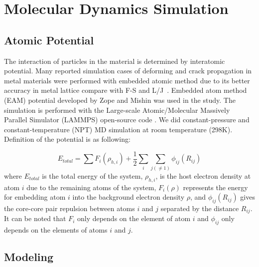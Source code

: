 \documentclass[materials,article,accept,moreauthors,pdftex,10pt,a4paper]{Definitions/mdpi}
\begin{document}
\section{Molecular Dynamics Simulation \label{section:method}}
\unskip
\subsection{Atomic Potential}

The interaction of particles in the material is determined by interatomic potential. Many reported simulation cases of deforming and crack propagation in metal materials were performed with embedded atomic method due to its better accuracy in metal lattice compare with F-S and L/J~\cite{Ko2015,Zepeda-Ruiz2017,Fan2018a}. Embedded atom method (EAM) potential developed by Zope and Mishin \cite{Zope2003} was used in the study. The simulation is performed  with the Large-scale Atomic/Molecular Massively Parallel Simulator (LAMMPS) open-source code \cite{Plimpton1995}. We did constant-pressure and constant-temperature (NPT) MD simulation at room temperature (298K). Definition of the potential is as following:

\begin{equation} \label{eq:eam}
E_{total}= \displaystyle\sum F_i(\rho_{h,i})+\frac{1}{2}\sum_i\sum_{j(\neq1)}\phi_{ij}(R_{ij})
\end{equation}
where $E_{total}$ is the total energy of the system, $\rho_{h,i}$, is the host electron density at atom $i$ due to the remaining atoms of the system, $F_i(\rho)$ represents the energy for embedding atom $i$ into the background electron density $\rho$, and $\phi_{ij}(R_{ij})$ gives the core-core pair repulsion between atoms $i$ and $j$ separated by the distance $R_{ij}$. It can be noted that $F_i$ only depends on the element of atom $i$ and $\phi_{ij}$ only depends on the elements of atoms $i$ and $j$.

\subsection{Modeling}
\end{document}
